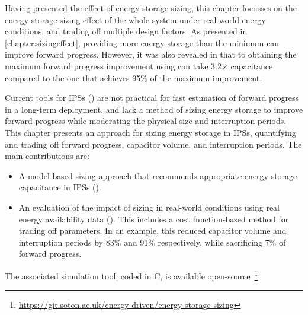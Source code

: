 Having presented the effect of energy storage sizing, this chapter focusses on the energy storage sizing effect of the whole system under real-world energy conditions, and trading off multiple design factors. 
As presented in \cref{chapter:sizingeffect}, providing more energy storage than the minimum can improve forward progress.
However, it was also revealed in  that to obtaining the maximum forward progress improvement using  can take 3.2$\times$ capacitance compared to the one that achieves 95\% of the maximum improvement. 

Current tools for IPSs () are not practical for fast estimation of forward progress in a long-term deployment, and lack a method of sizing energy storage to improve forward progress while moderating the physical size and interruption periods. 
This chapter presents an approach for sizing energy storage in IPSs, quantifying and trading off forward progress, capacitor volume, and interruption periods. 
The main contributions are:
\begin{itemize}
    \item A model-based sizing approach that recommends appropriate energy storage capacitance in IPSs ().
    \item An evaluation of the impact of sizing in real-world conditions using real energy availability data (). 
    This includes a cost function-based method for trading off parameters. 
    In an example, this reduced capacitor volume and interruption periods by 83\% and 91\% respectively, while sacrificing 7\% of forward progress.
\end{itemize}

The associated simulation tool, coded in C, is available open-source~\footnote{\url{https://git.soton.ac.uk/energy-driven/energy-storage-sizing}}. 

